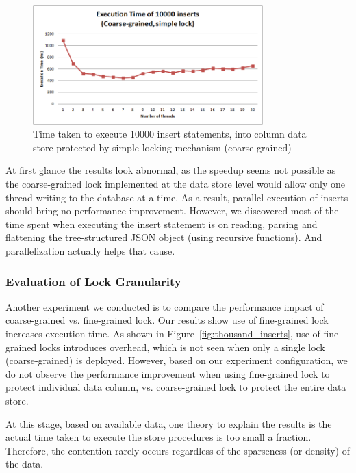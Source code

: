 \documentclass[11pt,journal,compsoc]{IEEEtran}
\begin{document}
\begin{figure}[!t]
\centering
\includegraphics[width=3.5in]{images/simple_lock}
\caption{Time taken to execute 10000 insert statements, into column data store protected by simple locking mechanism (coarse-grained) }
\label{fig:simple_lock}
\end{figure}


At first glance the results look abnormal, as the speedup seems not possible as the coarse-grained lock implemented at the data store level would allow only one thread writing to the database at a time. As a result, parallel execution of inserts should bring no performance improvement. However, we discovered most of the time spent when executing the insert statement is on reading, parsing and flattening the tree-structured JSON object (using recursive functions). And parallelization actually helps that cause.


\subsubsection{Evaluation of Lock Granularity}

Another experiment we conducted is to compare the performance impact of coarse-grained vs. fine-grained lock. Our results show use of fine-grained lock increases execution time. As shown in Figure~\ref{fig:thousand_inserts}, use of fine-grained locks introduces overhead, which is not seen when only a single lock (coarse-grained) is deployed. However, based on our experiment configuration, we do not observe the performance improvement when using fine-grained lock to protect individual data column, vs. coarse-grained lock to protect the entire data store.
 
At this stage, based on available data, one theory to explain the results is the actual time taken to execute the store procedures is too small a fraction. Therefore, the contention rarely occurs regardless of the sparseness (or density) of the data.
\end{document}
